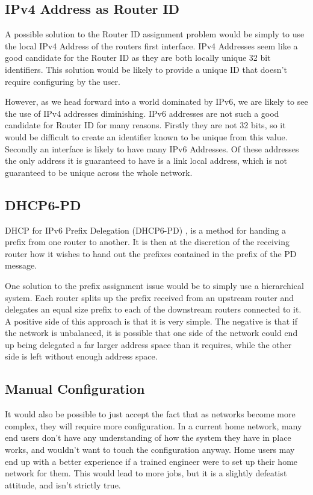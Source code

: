 \documentclass[12pt]{report}
\begin{document}
\subsection{IPv4 Address as Router ID}
A possible solution to the Router ID assignment problem would be simply to use
the local IPv4 Address of the routers first interface. IPv4 Addresses seem like
a good candidate for the Router ID as they are both locally unique 32 bit
identifiers. This solution would be likely to provide a unique ID that doesn't
require configuring by the user.
 
However, as we head forward into a world dominated by IPv6, we are likely to
see the use of IPv4 addresses diminishing. IPv6 addresses are not such a good
candidate for Router ID for many reasons. Firstly they are not 32 bits, so it
would be difficult to create an identifier known to be unique from this value.
Secondly an interface is likely to have many IPv6 Addresses. Of these addresses
the only address it is guaranteed to have is a link local address, which is not
guaranteed to be unique across the whole network. 

\subsection{DHCP6-PD}
DHCP for IPv6 Prefix Delegation (DHCP6-PD) , is a method for handing a prefix from one router to
another. It is then at the discretion of the receiving router how it wishes to
hand out the prefixes contained in the prefix of the PD message. 

One solution to the prefix assignment issue would be to simply use a
hierarchical system. Each router splits up the prefix received from an upstream
router and delegates an equal size prefix to each of the downstream routers
connected to it. A positive side of this approach is that it is very simple.
The negative is that if the network is unbalanced, it is possible that one side
of the network could end up being delegated a far larger address space than it
requires, while the other side is left without enough address space.  

\subsection{Manual Configuration}
It would also be possible to just accept the fact that as networks become more
complex, they will require more configuration. In a current home network, many
end users don't have any understanding of how the system they have in place
works, and wouldn't want to touch the configuration anyway. Home users may end
up with a better experience if a trained engineer were to set up their home
network for them. This would lead to more jobs, but it is a slightly defeatist
attitude, and isn't strictly true. 
\end{document}
